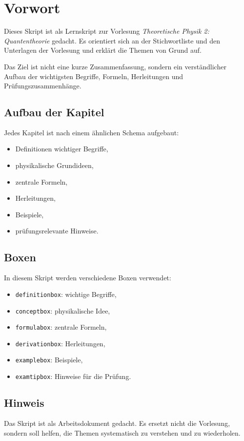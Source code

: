 \chapter*{Vorwort}

Dieses Skript ist als Lernskript zur Vorlesung \emph{Theoretische Physik 2: Quantentheorie}
gedacht. Es orientiert sich an der Stichwortliste und den Unterlagen der Vorlesung und erklärt die Themen
von Grund auf.

Das Ziel ist nicht eine kurze Zusammenfassung, sondern ein verständlicher Aufbau der
wichtigsten Begriffe, Formeln, Herleitungen und Prüfungszusammenhänge.

\section*{Aufbau der Kapitel}

Jedes Kapitel ist nach einem ähnlichen Schema aufgebaut:
\begin{itemize}
    \item Definitionen wichtiger Begriffe,
    \item physikalische Grundideen,
    \item zentrale Formeln,
    \item Herleitungen,
    \item Beispiele,
    \item prüfungsrelevante Hinweise.
\end{itemize}

\section*{Boxen}

In diesem Skript werden verschiedene Boxen verwendet:
\begin{itemize}
    \item \texttt{definitionbox}: wichtige Begriffe,
    \item \texttt{conceptbox}: physikalische Idee,
    \item \texttt{formulabox}: zentrale Formeln,
    \item \texttt{derivationbox}: Herleitungen,
    \item \texttt{examplebox}: Beispiele,
    \item \texttt{examtipbox}: Hinweise für die Prüfung.
\end{itemize}

\section*{Hinweis}

Das Skript ist als Arbeitsdokument gedacht. Es ersetzt nicht die Vorlesung,
sondern soll helfen, die Themen systematisch zu verstehen und zu wiederholen.